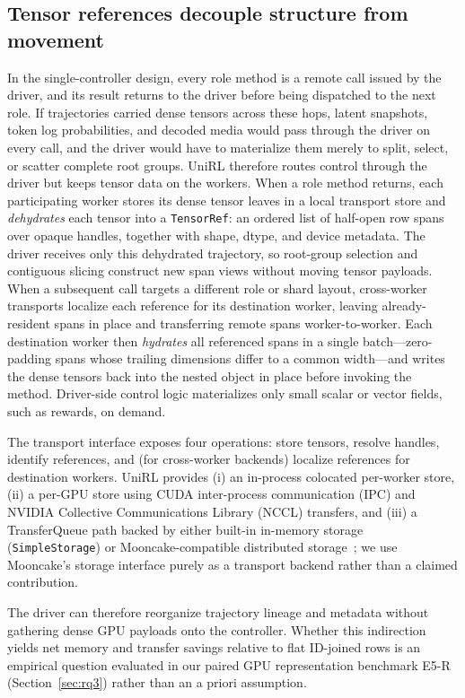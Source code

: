 \documentclass[10pt]{article}
\begin{document}
\subsection{Tensor references decouple structure from movement}

In the single-controller design, every role method is a remote call issued by the driver, and its result returns to the driver before being dispatched to the next role.
If trajectories carried dense tensors across these hops, latent snapshots, token log probabilities, and decoded media would pass through the driver on every call, and the driver would have to materialize them merely to split, select, or scatter complete root groups.
UniRL therefore routes control through the driver but keeps tensor data on the workers.
When a role method returns, each participating worker stores its dense tensor leaves in a local transport store and \emph{dehydrates} each tensor into a \texttt{TensorRef}: an ordered list of half-open row spans over opaque handles, together with shape, dtype, and device metadata.
The driver receives only this dehydrated trajectory, so root-group selection and contiguous slicing construct new span views without moving tensor payloads.
When a subsequent call targets a different role or shard layout, cross-worker transports localize each reference for its destination worker, leaving already-resident spans in place and transferring remote spans worker-to-worker.
Each destination worker then \emph{hydrates} all referenced spans in a single batch---zero-padding spans whose trailing dimensions differ to a common width---and writes the dense tensors back into the nested object in place before invoking the method.
Driver-side control logic materializes only small scalar or vector fields, such as rewards, on demand.

The transport interface exposes four operations: store tensors, resolve handles, identify references, and (for cross-worker backends) localize references for destination workers.
UniRL provides (i) an in-process colocated per-worker store, (ii) a per-GPU store using CUDA inter-process communication (IPC) and NVIDIA Collective Communications Library (NCCL) transfers, and (iii) a TransferQueue path backed by either built-in in-memory storage (\texttt{SimpleStorage}) or Mooncake-compatible distributed storage~\citep{qin2024mooncake}; we use Mooncake's storage interface purely as a transport backend rather than a claimed contribution.

The driver can therefore reorganize trajectory lineage and metadata without gathering dense GPU payloads onto the controller.
Whether this indirection yields net memory and transfer savings relative to flat ID-joined rows is an empirical question evaluated in our paired GPU representation benchmark E5-R (Section~\ref{sec:rq3}) rather than an a priori assumption.
\end{document}
